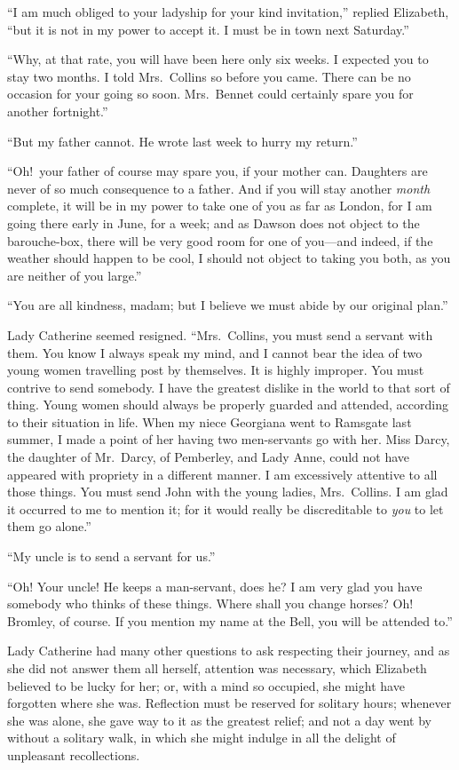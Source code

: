 \documentclass[12pt,english,oneside]{book}
\begin{document}
{}``I am much obliged to your ladyship for your kind invitation,''
replied Elizabeth, {}``but it is not in my power to accept it. I
must be in town next Saturday.''

{}``Why, at that rate, you will have been here only six weeks. I
expected you to stay two months. I told Mrs.\ Collins so before you
came. There can be no occasion for your going so soon. Mrs.\ Bennet
could certainly spare you for another fortnight.''

{}``But my father cannot. He wrote last week to hurry my return.''

{}``Oh!\ your father of course may spare you, if your mother can.
Daughters are never of so much consequence to a father. And if you
will stay another \textit{month} complete, it will be in my power
to take one of you as far as London, for I am going there early in
June, for a week; and as Dawson does not object to the barouche-box,
there will be very good room for one of you\mbox{---}and indeed,
if the weather should happen to be cool, I should not object to taking
you both, as you are neither of you large.''

{}``You are all kindness, madam; but I believe we must abide by our
original plan.''

Lady Catherine seemed resigned. {}``Mrs.\ Collins, you must send
a servant with them. You know I always speak my mind, and I cannot
bear the idea of two young women travelling post by themselves. It
is highly improper. You must contrive to send somebody. I have the
greatest dislike in the world to that sort of thing. Young women should
always be properly guarded and attended, according to their situation
in life. When my niece Georgiana went to Ramsgate last summer, I made
a point of her having two men-servants go with her. Miss Darcy, the
daughter of Mr.\ Darcy, of Pemberley, and Lady Anne, could not have
appeared with propriety in a different manner. I am excessively attentive
to all those things. You must send John with the young ladies, Mrs.\ Collins.
I am glad it occurred to me to mention it; for it would really be
discreditable to \textit{you} to let them go alone.''

{}``My uncle is to send a servant for us.''

{}``Oh! Your uncle! He keeps a man-servant, does he? I am very glad
you have somebody who thinks of these things. Where shall you change
horses? Oh! Bromley, of course. If you mention my name at the Bell,
you will be attended to.''

Lady Catherine had many other questions to ask respecting their journey,
and as she did not answer them all herself, attention was necessary,
which Elizabeth believed to be lucky for her; or, with a mind so occupied,
she might have forgotten where she was. Reflection must be reserved
for solitary hours; whenever she was alone, she gave way to it as
the greatest relief; and not a day went by without a solitary walk,
in which she might indulge in all the delight of unpleasant recollections.
\end{document}
